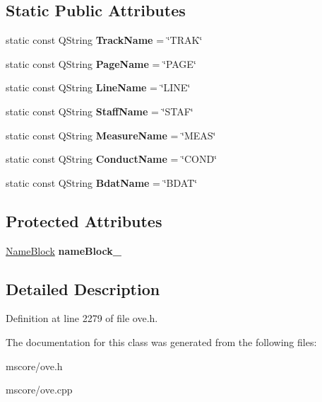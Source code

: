 \subsection*{Static Public Attributes}
\begin{DoxyCompactItemize}
\item 
\mbox{\label{class_o_v_e_1_1_chunk_a19d5ab5b937cc5be379eb578d7a56d09}} 
static const Q\+String {\bfseries Track\+Name} = \char`\"{}T\+R\+AK\char`\"{}
\item 
\mbox{\label{class_o_v_e_1_1_chunk_a417aee716958f8128079378bfdf865ad}} 
static const Q\+String {\bfseries Page\+Name} = \char`\"{}P\+A\+GE\char`\"{}
\item 
\mbox{\label{class_o_v_e_1_1_chunk_a07619eab3505da7256f89b54c0b5fc31}} 
static const Q\+String {\bfseries Line\+Name} = \char`\"{}L\+I\+NE\char`\"{}
\item 
\mbox{\label{class_o_v_e_1_1_chunk_a5c0672c64ec3864681c66b09593c95a8}} 
static const Q\+String {\bfseries Staff\+Name} = \char`\"{}S\+T\+AF\char`\"{}
\item 
\mbox{\label{class_o_v_e_1_1_chunk_ab9d630fee2933f146c18186436233c12}} 
static const Q\+String {\bfseries Measure\+Name} = \char`\"{}M\+E\+AS\char`\"{}
\item 
\mbox{\label{class_o_v_e_1_1_chunk_a698480432314d105d8b12f56d2627d16}} 
static const Q\+String {\bfseries Conduct\+Name} = \char`\"{}C\+O\+ND\char`\"{}
\item 
\mbox{\label{class_o_v_e_1_1_chunk_ab23b4306caf1a46f7dfc6bad147ababd}} 
static const Q\+String {\bfseries Bdat\+Name} = \char`\"{}B\+D\+AT\char`\"{}
\end{DoxyCompactItemize}
\subsection*{Protected Attributes}
\begin{DoxyCompactItemize}
\item 
\mbox{\label{class_o_v_e_1_1_chunk_a8789811063ae2e1ed73374335168d4e1}} 
\hyperlink{class_o_v_e_1_1_name_block}{Name\+Block} {\bfseries name\+Block\+\_\+}
\end{DoxyCompactItemize}


\subsection{Detailed Description}


Definition at line 2279 of file ove.\+h.



The documentation for this class was generated from the following files\+:\begin{DoxyCompactItemize}
\item 
mscore/ove.\+h\item 
mscore/ove.\+cpp\end{DoxyCompactItemize}
